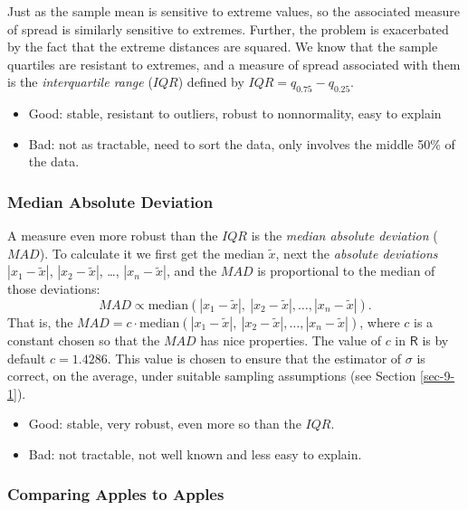 \documentclass[captions=tableheading]{scrbook}
\begin{document}
Just as the sample mean is sensitive to extreme values, so the associated measure of spread is similarly sensitive to extremes. Further, the problem is exacerbated by the fact that the extreme distances are squared. We know that the sample quartiles are resistant to extremes, and a measure of spread associated with them is the \emph{interquartile range} (\(IQR\)) defined by \(IQR=q_{0.75}-q_{0.25}\).

\begin{itemize}
\item Good: stable, resistant to outliers, robust to nonnormality, easy to explain
\item Bad: not as tractable, need to sort the data, only involves the middle 50\% of the data.
\end{itemize}
\subsubsection{Median Absolute Deviation}
\label{sec-3-3-4-3}


A measure even more robust than the \(IQR\) is the \emph{median absolute deviation} (\(MAD\)). To calculate it we first get the median \(\widetilde{x}\), next the \emph{absolute deviations} \(|x_{1}-\tilde{x}|\), \(|x_{2}-\tilde{x}|\), \ldots{}, \(|x_{n}-\tilde{x}|\), and the \(MAD\) is proportional to the median of those deviations:
\begin{equation}
MAD\propto\mbox{median}(|x_{1}-\tilde{x}|,\ |x_{2}-\tilde{x}|,\ldots,|x_{n}-\tilde{x}|).
\end{equation}
That is, the \(MAD=c\cdot\mbox{median}(|x_{1}-\tilde{x}|,\ |x_{2}-\tilde{x}|,\ldots,|x_{n}-\tilde{x}|)\), where \(c\) is a constant chosen so that the \(MAD\) has nice properties. The value of \(c\) in \(\mathsf{R}\) is by default \(c=1.4286\). This value is chosen to ensure that the estimator of \(\sigma\) is correct, on the average, under suitable sampling assumptions (see Section \ref{sec-9-1}).
\begin{itemize}
\item Good: stable, very robust, even more so than the \(IQR\).
\item Bad: not tractable, not well known and less easy to explain.
\end{itemize}
\subsubsection{Comparing Apples to Apples}
\label{sec-3-3-4-4}
\end{document}
